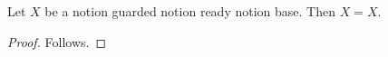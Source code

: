 

\begin{proposition}\label{notion_completed_sibling}
    Let $X$ be a notion guarded notion ready notion base.
    Then $X=X$.
\end{proposition}
\begin{proof}
    Follows.
\end{proof}
